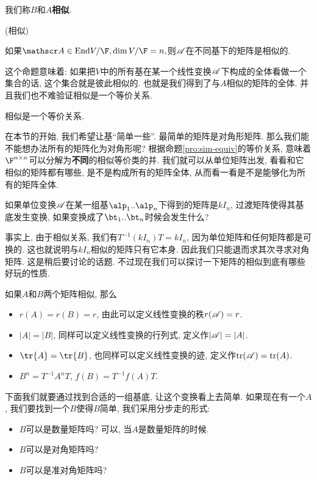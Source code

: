 我们称$B$和$A$\textbf{相似}. 
\begin{defn}
(相似)
\end{defn}
\begin{thm}
如果$\huaa\in\End V/\F,\dim V/\F=n,$则$\mathscr{A}$在不同基下的矩阵是相似的. 
\end{thm}
这个命题意味着: 如果把$V$中的所有基在某一个线性变换$\mathscr{A}$下构成的全体看做一个集合的话, 这个集合就是彼此相似的.
也就是我们得到了与$A$相似的矩阵的全体. 并且我们也不难验证相似是一个等价关系. 
\begin{prop}
\label{pro:sim-equiv}相似是一个等价关系.
\end{prop}
在本节的开始, 我们希望让基``简单一些''. 最简单的矩阵是对角形矩阵. 那么我们能不能想办法所有的矩阵化为对角形呢? 根据命题\ref{pro:sim-equiv}的等价关系,
意味着$\F^{n\times n}$可以分解为\textbf{不同}的相似等价类的并. 我们就可以从单位矩阵出发, 看看和它相似的矩阵都有哪些,
是不是构成所有的矩阵全体, 从而看一看是不是能够化为所有的矩阵全体. 
\begin{example}
如果单位变换$\mathscr{A}$在某一组基$\alp_{1}..\alp_{n}$下得到的矩阵是$kI_{n}$, 过渡矩阵使得其基底发生变换,
如果变换成了$\bt_{1}..\bt_{n}$时候会发生什么?

事实上, 由于相似关系, 我们有$T^{-1}(kI_{n})T=kI_{n}$, 因为单位矩阵和任何矩阵都是可换的. 这也就说明与$kI_{n}$相似的矩阵只有它本身.
因此我们只能退而求其次寻求对角矩阵. 这是稍后要讨论的话题. 不过现在我们可以探讨一下矩阵的相似到底有哪些好玩的性质. 
\end{example}
\begin{prop}
如果$A$和$B$两个矩阵相似, 那么
\end{prop}
\begin{itemize}
\item $r(A)=r(B)=r$, 由此可以定义线性变换的秩$r(\mathscr{A})=r$.
\item $|A|=|B|$, 同样可以定义线性变换的行列式, 定义作$|\mathscr{A}|=|A|$.
\item $\tr{\text{\ensuremath{A}}}=\tr{\text{\ensuremath{B}}}$, 也同样可以定义线性变换的迹,
定义作$\text{tr}(\mathscr{A})=\text{tr}(A)$.
\item $B^{n}=T^{-1}A^{n}T$, $f(B)=T^{-1}f(A)T$. 
\end{itemize}
下面我们就要通过找到合适的一组基底, 让这个变换看上去简单. 如果现在有一个$A$, 我们要找到一个$B$使得$B$简单, 我们采用分步走的形式: 
\begin{itemize}
\item $B$可以是数量矩阵吗? 可以, 当$A$是数量矩阵的时候. 
\item $B$可以是对角矩阵吗?
\item $B$可以是准对角矩阵吗? 
\end{itemize}
